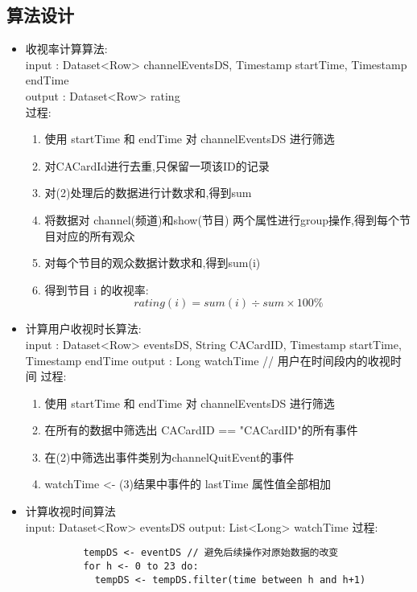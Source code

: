 \documentclass{hitreport}
\begin{document}
\subsection{算法设计}
\begin{itemize}
  \item 收视率计算算法:\\
        input : Dataset<Row> channelEventsDS, Timestamp startTime, Timestamp endTime\\
        output : Dataset<Row> rating\\
        过程:
        \begin{enumerate}
          \item 使用 startTime 和 endTime 对 channelEventsDS 进行筛选
          \item 对CACardId进行去重,只保留一项该ID的记录
          \item 对(2)处理后的数据进行计数求和,得到sum
          \item 将数据对 channel(频道)和show(节目) 两个属性进行group操作,得到每个节目对应的所有观众
          \item 对每个节目的观众数据计数求和,得到sum(i)
          \item 得到节目 i 的收视率: $$rating(i) = sum(i)\div sum \times 100\% $$
        \end{enumerate}
  \item 计算用户收视时长算法: \\
        input : Dataset<Row> eventsDS, String CACardID, Timestamp startTime, Timestamp endTime
        output : Long watchTime // 用户在时间段内的收视时间
        过程:
        \begin{enumerate}
          \item 使用 startTime 和 endTime 对 channelEventsDS 进行筛选
          \item 在所有的数据中筛选出 CACardID == "CACardID"的所有事件
          \item 在(2)中筛选出事件类别为channelQuitEvent的事件
          \item watchTime <- (3)结果中事件的 lastTime 属性值全部相加
        \end{enumerate}
  \item 计算收视时间算法\\
        input: Dataset<Row> eventsDS
        output: List<Long> watchTime
        过程:
        \begin{lstlisting}
          tempDS <- eventDS // 避免后续操作对原始数据的改变
          for h <- 0 to 23 do:
            tempDS <- tempDS.filter(time between h and h+1)

\end{lstlisting}
\end{itemize}
\end{document}
